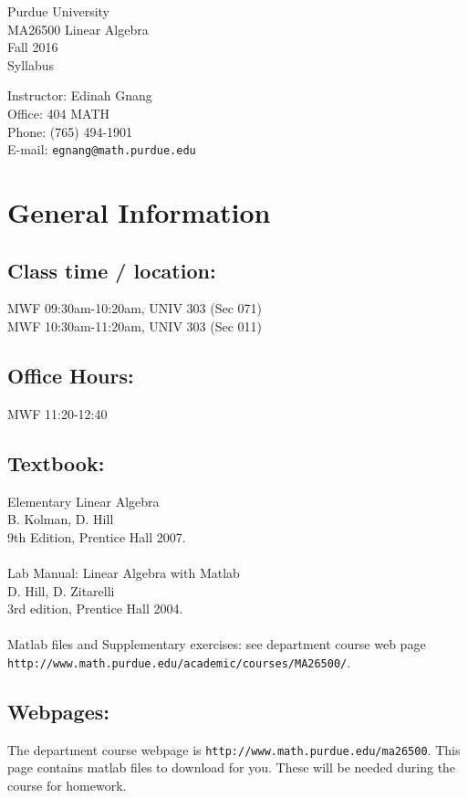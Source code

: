 \documentclass[10pt]{article}
\begin{document}
\noindent\parbox{7cm}{\large Purdue University\\
                    MA26500 Linear Algebra\\
                    Fall 2016\\
                    Syllabus}
\hfill
\parbox{7cm}{\large Instructor: Edinah Gnang\\
                    Office: 404 MATH\\
                    Phone:   (765) 494-1901\\
                    E-mail: {\tt egnang@math.purdue.edu}}

\section{General Information}

\subsection{Class time / location:}
                    MWF 09:30am-10:20am, UNIV 303 (Sec 071)\\
                    MWF 10:30am-11:20am, UNIV 303 (Sec 011)\\ 

\subsection{Office Hours:}   
		    MWF 11:20-12:40

\subsection{Textbook:}
                Elementary Linear Algebra\\
                B. Kolman, D. Hill\\
		9th Edition, Prentice Hall 2007.\\
\\
                Lab Manual: Linear Algebra with Matlab\\
		D. Hill, D. Zitarelli\\
		3rd edition, Prentice Hall 2004.\\
\\
                Matlab files and Supplementary exercises: see
                department course web page {\tt http://www.math.purdue.edu/academic/courses/MA26500/}.
\subsection{Webpages:}
\noindent The department course webpage is {\tt http://www.math.purdue.edu/ma26500}. \smallskip
This page contains matlab files to
download for you. These will be needed during the course for
homework.\smallskip
\end{document}
